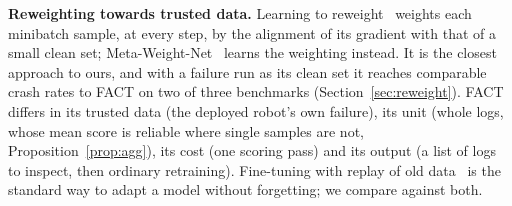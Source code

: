 \documentclass[preprint,12pt]{elsarticle}
\newcommand{\method}{FACT}
\begin{document}
\textbf{Reweighting towards trusted data.} Learning to reweight~\citep{ren2018l2rw} weights each minibatch sample, at every step, by the alignment of its gradient with that of a small clean set; Meta-Weight-Net~\citep{shu2019mwn} learns the weighting instead. It is the closest approach to ours, and with a failure run as its clean set it reaches comparable crash rates to \method{} on two of three benchmarks (Section~\ref{sec:reweight}). \method{} differs in its trusted data (the deployed robot's own failure), its unit (whole logs, whose mean score is reliable where single samples are not, Proposition~\ref{prop:agg}), its cost (one scoring pass) and its output (a list of logs to inspect, then ordinary retraining). Fine-tuning with replay of old data~\citep{rolnick2019replay} is the standard way to adapt a model without forgetting; we compare against both.
\end{document}
